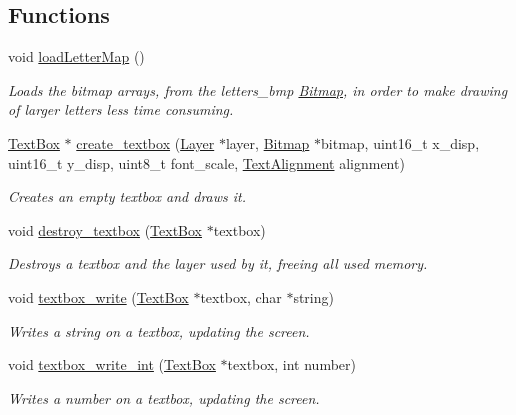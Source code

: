 \subsection*{Functions}
\begin{DoxyCompactItemize}
\item 
void \mbox{\hyperlink{group__textbox_gac90ac8157e721b0af9b86534c5a93047}{load\+Letter\+Map}} ()
\begin{DoxyCompactList}\small\item\em Loads the bitmap arrays, from the letters\+\_\+bmp \mbox{\hyperlink{struct_bitmap}{Bitmap}}, in order to make drawing of larger letters less time consuming. \end{DoxyCompactList}\item 
\mbox{\hyperlink{struct_text_box}{Text\+Box}} $\ast$ \mbox{\hyperlink{group__textbox_gabf9a7ec0dd3b157d66069418c95318ea}{create\+\_\+textbox}} (\mbox{\hyperlink{struct_layer}{Layer}} $\ast$layer, \mbox{\hyperlink{struct_bitmap}{Bitmap}} $\ast$bitmap, uint16\+\_\+t x\+\_\+disp, uint16\+\_\+t y\+\_\+disp, uint8\+\_\+t font\+\_\+scale, \mbox{\hyperlink{group__textbox_gaa56f1a82069b5feeadbb4591cb3e474f}{Text\+Alignment}} alignment)
\begin{DoxyCompactList}\small\item\em Creates an empty textbox and draws it. \end{DoxyCompactList}\item 
void \mbox{\hyperlink{group__textbox_ga75a9b146a69f4c875b18b683f7e5f872}{destroy\+\_\+textbox}} (\mbox{\hyperlink{struct_text_box}{Text\+Box}} $\ast$textbox)
\begin{DoxyCompactList}\small\item\em Destroys a textbox and the layer used by it, freeing all used memory. \end{DoxyCompactList}\item 
void \mbox{\hyperlink{group__textbox_ga71eed99ce4466e9e7b3ad1b9d61f2312}{textbox\+\_\+write}} (\mbox{\hyperlink{struct_text_box}{Text\+Box}} $\ast$textbox, char $\ast$string)
\begin{DoxyCompactList}\small\item\em Writes a string on a textbox, updating the screen. \end{DoxyCompactList}\item 
void \mbox{\hyperlink{group__textbox_ga6a60cec4ef24e6e154b93aa81af2b988}{textbox\+\_\+write\+\_\+int}} (\mbox{\hyperlink{struct_text_box}{Text\+Box}} $\ast$textbox, int number)
\begin{DoxyCompactList}\small\item\em Writes a number on a textbox, updating the screen. \end{DoxyCompactList}\item 

\end{DoxyCompactItemize}
